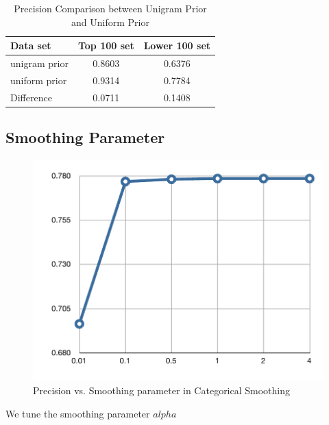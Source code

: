 \begin{table}[t]
\caption{Precision Comparison between Unigram Prior and Uniform Prior}
\label{tab-prior-comparison}
\vskip 0.15in
\begin{center}
\begin{small}
\begin{sc}
\begin{tabular}{l|cc}
\hline
\abovespace \belowspace
Data set & Top 100 set & Lower 100 set \\
\hline
\abovespace
unigram prior & 0.8603 & 0.6376 \\
\belowspace
uniform prior & 0.9314 & 0.7784 \\
\hline
\abovespace
\belowspace
Difference & 0.0711 & 0.1408 \\
\hline
\end{tabular}
\end{sc}
\end{small}
\end{center}
\vskip -0.1in
\end{table}

\subsection{Smoothing Parameter}

\begin{figure}[ht]
\vskip 0.2in
\begin{center}
\centerline{\includegraphics[width=\columnwidth]{pvsalpha}}
\caption{Precision vs. Smoothing parameter in Categorical Smoothing}
\label{fig-p-vs-alpha}
\end{center}
\vskip -0.2in
\end{figure}

We tune the smoothing parameter $alpha$



